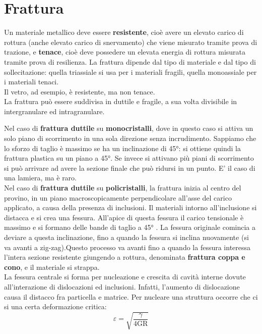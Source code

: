 \setchapterpreamble[u]{\margintoc}
\chapter{Frattura}

Un materiale metallico deve essere \textbf{resistente}, cioè avere un elevato carico di rottura (anche elevato carico di snervamento) che viene misurato tramite prova di trazione, e \textbf{tenace}, cioè deve possedere un elevata energia di rottura misurata tramite prova di resilienza. La frattura dipende dal tipo di materiale e dal tipo di sollecitazione: quella triassiale si usa per i materiali fragili, quella monoassiale per i materiali tenaci.\\
Il vetro, ad esempio, è resistente, ma non tenace.\\
La frattura può essere suddivisa in duttile e fragile, a sua volta divisibile in intergranulare ed intragranulare.

Nel caso di \textbf{frattura duttile} su \textbf{monocristalli}, dove in questo caso si attiva un solo piano di scorrimento in una sola direzione senza incrudimento. Sappiamo che lo sforzo di taglio è massimo se ha un inclinazione di 45°: si ottiene quindi la frattura plastica su un piano a 45°. Se invece si attivano più piani di scorrimento si può arrivare ad avere la sezione finale che può ridursi in un punto. E’ il caso di una lamiera, ma è raro.\\
Nel caso di \textbf{frattura duttile} su \textbf{policristalli}, la frattura inizia al centro del provino, in un piano macroscopicamente perpendicolare all’asse del carico applicato, a causa della presenza di inclusioni. Il materiali intorno all’inclusione si distacca e si crea una fessura. All’apice di questa fessura il carico tensionale è massimo e si formano delle bande di taglio a 45° . La fessura originale comincia a deviare a questa inclinazione, fino a quando la fessura si inclina nuovamente (si va avanti a zig-zag).Questo processo va avanti fino a quando la fessura interessa l’intera sezione resistente giungendo a rottura, denominata \textbf{frattura coppa e cono}, e il materiale si strappa.\\
La fessura centrale si forma per nucleazione e crescita di cavità interne dovute all’interazione di dislocazioni ed inclusioni. Infatti, l’aumento di dislocazione causa il distacco fra particella e matrice. Per nucleare una struttura occorre che ci si una certa deformazione critica:
\begin{equation*}
    \varepsilon=\sqrt{\frac{\gamma}{4\mathrm{GR}}}
\end{equation*}

